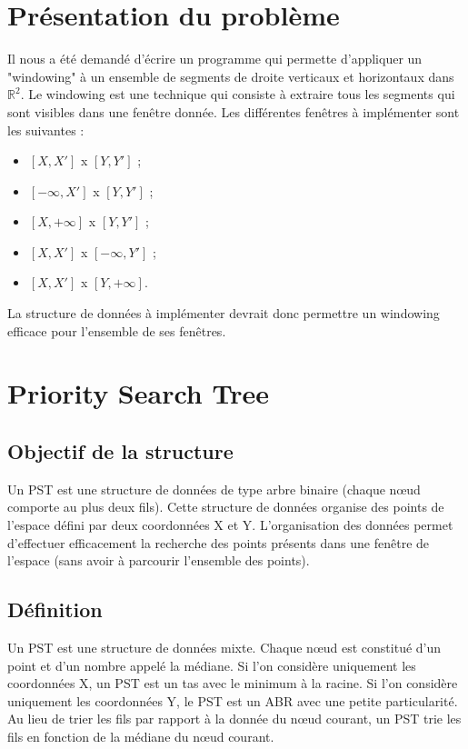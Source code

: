 \documentclass[10pt,a4paper]{article}
\begin{document}
\section{Présentation du problème}
Il nous a été demandé d'écrire un programme qui permette d'appliquer un "windowing" à un ensemble de segments de droite verticaux et horizontaux dans $\mathbb{R}^2$. Le windowing est une technique qui consiste à extraire tous les segments qui sont visibles dans une fenêtre donnée. Les différentes fenêtres à implémenter sont les suivantes :
\begin{itemize}
	\item $[X, X']$ x $[Y, Y']$ ;
	\item $[-\infty, X']$ x $[Y, Y']$ ;
	\item $[X, +\infty]$ x $[Y, Y']$ ;
	\item $[X, X']$ x $[-\infty, Y']$ ;
	\item $[X, X']$ x $[Y, +\infty]$.
\end{itemize}
La structure de données à implémenter devrait donc permettre un windowing efficace pour l'ensemble de ses fenêtres.


\newpage
\section{Priority Search Tree}

\subsection{Objectif de la structure}
Un PST est une structure de données de type arbre binaire (chaque nœud comporte au plus deux fils). Cette structure de données organise des points de l'espace défini par deux coordonnées X et Y. L'organisation des données permet d'effectuer efficacement la recherche des points présents dans une fenêtre de l'espace (sans avoir à parcourir l'ensemble des points).

\subsection{Définition}
Un PST est une structure de données mixte. Chaque nœud est constitué d'un point et d'un nombre appelé la médiane. Si l'on considère uniquement les coordonnées X, un PST est un tas avec le minimum à la racine. Si l'on considère uniquement les coordonnées Y, le PST est un ABR avec une petite particularité. Au lieu de trier les fils par rapport à la donnée du nœud courant, un PST trie les fils en fonction de la médiane du nœud courant.
\end{document}

